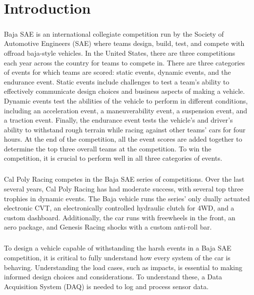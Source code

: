 \chapter{Introduction}

\paragraph{}
Baja SAE is an international collegiate competition run by the Society of Automotive Engineers (SAE) \cite{SAE} where teams design, build, test, and compete with offroad baja-style vehicles.
In the United States, there are three competitions each year across the country for teams to compete in. 
There are three categories of events for which teams are scored: static events, dynamic events, and the endurance event.  
Static events include challenges to test a team's ability to effectively communicate design choices and business aspects of making a vehicle.  
Dynamic events test the abilities of the vehicle to perform in different conditions, including an acceleration event, a maneuverability event, a suspension event, and a traction event.  
Finally, the endurance event tests the vehicle's and driver's ability to withstand rough terrain while racing against other teams' cars for four hours.
At the end of the competition, all the event scores are added together to determine the top three overall teams at the competition.
To win the competition, it is crucial to perform well in all three categories of events.

\paragraph{}
Cal Poly Racing \cite{CalPolyRacing} competes in the Baja SAE series of competitions.
Over the last several years, Cal Poly Racing has had moderate success, with several top three trophies in dynamic events.
The Baja vehicle runs the series' only dually actuated electronic CVT, an electronically controlled hydraulic clutch for 4WD, and a custom dashboard.
Additionally, the car runs with freewheels in the front, an aero package, and Genesis Racing shocks with a custom anti-roll bar.

\paragraph{}
To design a vehicle capable of withstanding the harsh events in a Baja SAE competition, it is critical to fully understand how every system of the car is behaving.
Understanding the load cases, such as impacts, is essential to making informed design choices and considerations.
To understand these, a Data Acquisition System (DAQ) is needed to log and process sensor data.

